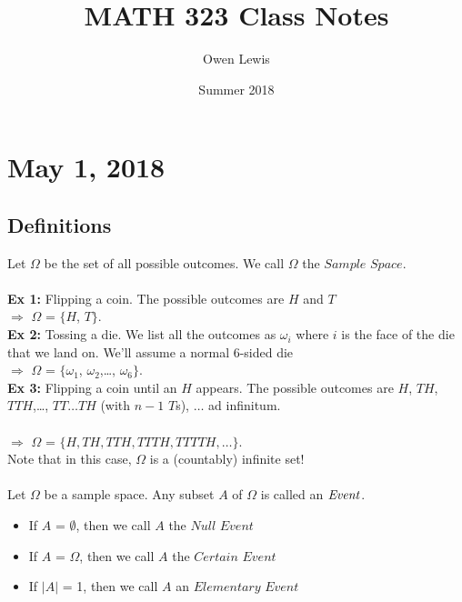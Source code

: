 \documentclass{article}
\title{MATH 323 Class Notes}
\author{Owen Lewis}
\date{Summer 2018}
\newcommand{\ti}[1]{\textit{#1}}
\newcommand{\imply}{\Rightarrow}
\begin{document}

\begin{titlepage}
\maketitle
\end{titlepage}

\tableofcontents
\newpage


\section{May 1, 2018}
\subsection{Definitions}
Let $\Omega$ be the set of all possible outcomes. We call $\Omega$ the $\ti{Sample Space}$.\\\\
\textbf{Ex 1:} Flipping a coin. The possible outcomes are $H$ and $T$\\
$\imply$ $\Omega$ = $\{$$H$, $T$$\}$.\\
\textbf{Ex 2:} Tossing a die. We list all the outcomes as $\omega_{i}$ where $i$ is the face of the die that we land on. We'll assume a normal 6-sided die\\ 
$\imply$ $\Omega$ = $\{$$\omega_{1}$, $\omega_{2}$,\dots, $\omega_{6}$$\}$.\\
\textbf{Ex 3:} Flipping a coin until an $H$ appears. The possible outcomes are $H$, $TH$, $TTH$,\dots, $TT$$\dots$$TH$ (with $n-1$ $T$s), $\dots$ ad infinitum.\\\\
$\imply$ $\Omega$ = $\{$$H, TH, TTH, TTTH, TTTTH,\dots$$\}$.\\
Note that in this case, $\Omega$ is a (countably) infinite set!\\\\
Let $\Omega$ be a sample space. Any subset $A$ of $\Omega$ is called an $\it{Event}$.
\begin{itemize}
	\item If $A$ = $\emptyset$, then we call $A$ the $\ti{Null Event}$
	\item If $A$ = $\Omega$, then we call $A$ the $\ti{Certain Event}$
	\item If $|$$A$$|$ = 1, then we call $A$ an $\ti{Elementary Event}$
\end{itemize}
\end{document}
